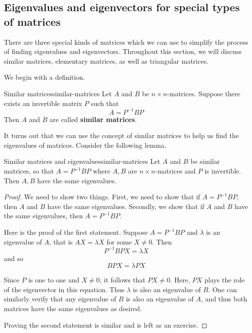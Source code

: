 \subsection{Eigenvalues and eigenvectors for special types of matrices}

There are three special kinds of matrices which we can use to simplify the process of finding eigenvalues and eigenvectors. 
Throughout this section, we will discuss similar matrices, elementary matrices, as well as triangular matrices. 

We begin with a definition.

\begin{definition}{Similar matrices}{similar-matrices}
Let $A$ and $B$ be $n \times n$-matrices. Suppose there exists an invertible matrix $P$ such that 
\begin{equation*}
A = P^{-1}BP
\end{equation*}
Then $A$ and $B$ are called \textbf{similar matrices}.
\end{definition}

It turns out that we can use the concept of similar matrices to help us find the eigenvalues
of matrices. Consider the following lemma.

\begin{lemma}{Similar matrices and eigenvalues}{similar-matrices}
Let $A$ and $B$ be similar matrices, so that $A=P^{-1}BP$ where $A,B$ are $n\times n$-matrices and $P$ is invertible. Then $A,B$ have the
same eigenvalues.
\end{lemma}

\begin{proof}
We need to show two things. First, we need to show that if
$A=P^{-1}BP$, then $A$ and $B$ have the same eigenvalues.  Secondly,
we show that if $A$ and $B$ have the same eigenvalues, then
$A=P^{-1}BP$.

Here is the proof of the first statement. 
Suppose $A = P^{-1}BP$ and $\lambda$ is an eigenvalue of $A$, that is $AX=\lambda X$ for some $X\neq 0$. Then
\begin{equation*}
P^{-1}BPX=\lambda X
\end{equation*}
and so
\begin{equation*}
BPX=\lambda PX
\end{equation*}

Since $P$ is one to one and $X \neq 0$, it follows that $PX \neq
0$. Here, $PX$ plays the role of the eigenvector in this equation.
Thus $\lambda$ is also an eigenvalue of $B$. One can similarly verify
that any eigenvalue of $B$ is also an eigenvalue of $A$, and thus both
matrices have the same eigenvalues as desired.

Proving the second statement is similar and is left as an exercise. 
\end{proof}

